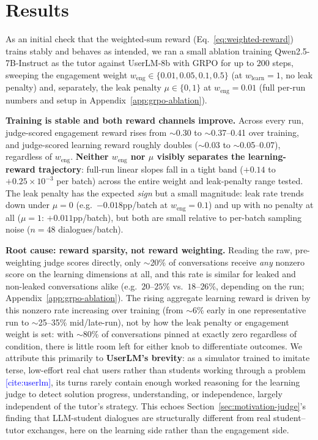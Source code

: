 \documentclass[11pt]{article}
\newcommand{\cit}[1]{\textcolor{blue}{[\textsf{cite:#1}]}}
\begin{document}
\section{Results}
\label{sec:results}

As an initial check that the weighted-sum reward (Eq.~\ref{eq:weighted-reward})
trains stably and behaves as intended, we ran a small ablation training
Qwen2.5-7B-Instruct as the tutor against UserLM-8b with GRPO for up to $200$
steps, sweeping the engagement weight $w_{\text{eng}} \in \{0.01, 0.05, 0.1,
0.5\}$ (at $w_{\text{learn}}=1$, no leak penalty) and, separately, the leak
penalty $\mu \in \{0, 1\}$ at $w_{\text{eng}}=0.01$ (full per-run numbers and
setup in Appendix~\ref{app:grpo-ablation}).

\textbf{Training is stable and both reward channels improve.} Across every
run, judge-scored engagement reward rises from $\sim$0.30 to $\sim$0.37--0.41
over training, and judge-scored learning reward roughly doubles ($\sim$0.03 to
$\sim$0.05--0.07), regardless of $w_{\text{eng}}$.
\textbf{Neither $w_{\text{eng}}$ nor $\mu$ visibly separates the learning-reward
trajectory}: full-run linear slopes fall in a tight band
($+0.14$ to $+0.25 \!\times\! 10^{-3}$ per batch) across the entire weight
and leak-penalty range tested. The leak penalty has the expected \emph{sign}
but a small magnitude: leak rate trends down under $\mu{=}0$ (e.g.\
$-0.018$pp/batch at $w_{\text{eng}}{=}0.1$) and up with no penalty at all
($\mu{=}1$: $+0.011$pp/batch), but both are small relative to per-batch
sampling noise ($n{=}48$ dialogues/batch).

\textbf{Root cause: reward sparsity, not reward weighting.} Reading the raw,
pre-weighting judge scores directly, only $\sim$20\% of conversations receive
\emph{any} nonzero score on the learning dimensions at all, and this rate is
similar for leaked and non-leaked conversations alike (e.g.\ $20$--$25$\% vs.\
$18$--$26$\%, depending on the run; Appendix~\ref{app:grpo-ablation}). The
rising aggregate learning reward is driven by this nonzero rate increasing
over training (from $\sim$6\% early in one representative run to
$\sim$25--35\% mid/late-run), not by how the leak penalty or engagement weight
is set: with $\sim$80\% of conversations pinned at exactly zero regardless of
condition, there is little room left for either knob to differentiate
outcomes. We attribute this primarily to \textbf{UserLM's brevity}: as a
simulator trained to imitate terse, low-effort real chat users rather than
students working through a problem \cit{userlm}, its turns rarely contain
enough worked reasoning for the learning judge to detect solution progress,
understanding, or independence, largely independent of the tutor's strategy.
This echoes Section~\ref{sec:motivation-judge}'s finding that LLM-student
dialogues are structurally different from real student--tutor exchanges, here
on the learning side rather than the engagement side.
\end{document}
